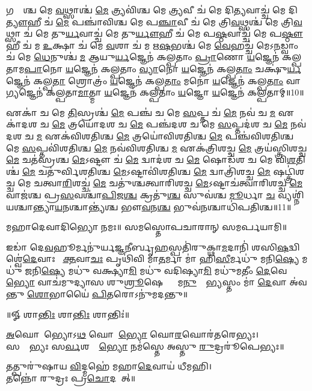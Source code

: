 𑌗𑌰𑍍𑌭𑌾᳚𑌶𑍍𑌚 𑌮𑍇 \ul{𑌵}𑌥𑍍𑌸𑌾𑌶𑍍𑌚॑ \ul{𑌮𑍇} 𑌤𑍍𑌰𑍍𑌯𑌵𑌿॑𑌶𑍍𑌚 𑌮𑍇 \ul{𑌤𑍍𑌰𑍍𑌯}𑌵𑍀 𑌚॑ 𑌮𑍇 𑌦𑌿\ul{𑌤𑍍𑌯}𑌵𑌾𑌚𑍍𑌚॑ 𑌮𑍇 𑌦𑌿\ul{𑌤𑍍𑌯𑍗}𑌹𑍀 𑌚॑ \ul{𑌮𑍇} 𑌪𑌞𑍍𑌚𑌾॑𑌵𑌿𑌶𑍍𑌚 𑌮𑍇 𑌪\ul{𑌞𑍍𑌚𑌾}𑌵𑍀 𑌚॑ 𑌮𑍇 𑌤𑍍𑌰𑌿\ul{𑌵}𑌥𑍍𑌸𑌶𑍍𑌚॑ 𑌮𑍇 𑌤𑍍𑌰𑌿\ul{𑌵}𑌥𑍍𑌸𑌾 𑌚॑ 𑌮𑍇 𑌤𑍁\ul{𑌰𑍍𑌯}𑌵𑌾𑌚𑍍𑌚॑ 𑌮𑍇 𑌤𑍁\ul{𑌰𑍍𑌯𑍗}𑌹𑍀 𑌚॑ 𑌮𑍇 𑌪\ul{𑌷𑍍𑌠}𑌵𑌾𑌚𑍍𑌚॑ 𑌮𑍇 𑌪\ul{𑌷𑍍𑌠𑍗}𑌹𑍀 𑌚॑ 𑌮 \ul{𑌉}𑌕𑍍𑌷𑌾 𑌚॑ 𑌮𑍇 \ul{𑌵}𑌶𑌾 𑌚॑ 𑌮 𑌋\ul{𑌷}𑌭𑌶𑍍𑌚॑ 𑌮𑍇 \ul{𑌵𑍇}𑌹𑌚𑍍𑌚॑ 𑌮𑍇𑌽\ul{𑌨}𑌡𑍍𑌵𑌾𑌂 𑌚॑ 𑌮𑍇 \ul{𑌧𑍇}𑌨𑍁𑌶𑍍𑌚॑ \ul{𑌮} 𑌆𑌯𑍁\ul{𑌰𑍍𑌯}𑌜𑍍𑌞𑍇𑌨॑ 𑌕𑌲𑍍𑌪𑌤𑌾𑌂 \ul{𑌪𑍍𑌰𑌾}𑌣𑍋 \ul{𑌯}𑌜𑍍𑌞𑍇𑌨॑ 𑌕𑌲𑍍𑌪𑌤𑌾𑌮\ul{𑌪𑌾}𑌨𑍋 \ul{𑌯}𑌜𑍍𑌞𑍇𑌨॑ 𑌕𑌲𑍍𑌪𑌤𑌾𑌂 \ul{𑌵𑍍𑌯𑌾}𑌨𑍋 \ul{𑌯}𑌜𑍍𑌞𑍇𑌨॑ 𑌕𑌲𑍍𑌪\ul{𑌤𑌾𑌂} 𑌚𑌕𑍍𑌷𑍁॑\ul{𑌰𑍍𑌯}𑌜𑍍𑌞𑍇𑌨॑ 𑌕𑌲𑍍𑌪\ul{𑌤𑌾}\ul{} 𑌶𑍍𑌰𑍋𑌤𑍍𑌰𑌂॑ \ul{𑌯}𑌜𑍍𑌞𑍇𑌨॑ 𑌕𑌲𑍍𑌪\ul{𑌤𑌾𑌂} 𑌮𑌨𑍋॑ \ul{𑌯}𑌜𑍍𑌞𑍇𑌨॑ 𑌕𑌲𑍍𑌪\ul{𑌤𑌾𑌂} 𑌵𑌾\ul{𑌗𑍍𑌯}𑌜𑍍𑌞𑍇𑌨॑ 𑌕𑌲𑍍𑌪𑌤𑌾\ul{𑌮𑌾}𑌤𑍍𑌮𑌾 \ul{𑌯}𑌜𑍍𑌞𑍇𑌨॑ 𑌕𑌲𑍍𑌪𑌤𑌾𑌂 \ul{𑌯}𑌜𑍍𑌞𑍋 \ul{𑌯}𑌜𑍍𑌞𑍇𑌨॑ 𑌕𑌲𑍍𑌪𑌤𑌾𑌮𑍍॥10॥ 

𑌏𑌕𑌾॑ 𑌚 𑌮𑍇 \ul{𑌤𑌿}𑌸𑍍𑌰𑌶𑍍𑌚॑ \ul{𑌮𑍇} 𑌪𑌞𑍍𑌚॑ 𑌚 𑌮𑍇 \ul{𑌸}𑌪𑍍𑌤 𑌚॑ \ul{𑌮𑍇} 𑌨𑌵॑ 𑌚 \ul{𑌮} 𑌏𑌕𑌾॑𑌦𑌶 𑌚 \ul{𑌮𑍇} 𑌤𑍍𑌰𑌯𑍋॑𑌦𑌶 𑌚 \ul{𑌮𑍇} 𑌪𑌞𑍍𑌚॑𑌦𑌶 𑌚 𑌮𑍇 \ul{𑌸}𑌪𑍍𑌤𑌦॑𑌶 𑌚 \ul{𑌮𑍇} 𑌨𑌵॑𑌦𑌶 𑌚 \ul{𑌮} 𑌏𑌕॑𑌵𑌿𑌶𑌤𑌿𑌶𑍍𑌚 \ul{𑌮𑍇} 𑌤𑍍𑌰𑌯𑍋॑𑌵𑌿𑌶𑌤𑌿𑌶𑍍𑌚 \ul{𑌮𑍇} 𑌪𑌞𑍍𑌚॑𑌵𑌿𑌶𑌤𑌿𑌶𑍍𑌚 𑌮𑍇 \ul{𑌸}𑌪𑍍𑌤𑌵𑌿॑𑌶𑌤𑌿𑌶𑍍𑌚 \ul{𑌮𑍇} 𑌨𑌵॑𑌵𑌿𑌶𑌤𑌿𑌶𑍍𑌚 \ul{𑌮} 𑌏𑌕॑𑌤𑍍𑌰𑌿𑌶𑌚𑍍𑌚 \ul{𑌮𑍇} 𑌤𑍍𑌰𑌯॑𑌸𑍍𑌤𑍍𑌰𑌿𑌶𑌚𑍍𑌚 \ul{𑌮𑍇} 𑌚𑌤॑𑌸𑍍𑌰𑌶𑍍𑌚 \ul{𑌮𑍇}𑌽𑌷𑍍𑌟𑍗 𑌚॑ \ul{𑌮𑍇} 𑌦𑍍𑌵𑌾𑌦॑𑌶 𑌚 \ul{𑌮𑍇} 𑌷𑍋𑌡॑𑌶 𑌚 𑌮𑍇 𑌵𑌿\ul{𑌶}𑌤𑌿𑌶𑍍𑌚॑ \ul{𑌮𑍇} 𑌚𑌤𑍁॑𑌰𑍍𑌵𑌿𑌶𑌤𑌿𑌶𑍍𑌚 \ul{𑌮𑍇}𑌽𑌷𑍍𑌟𑌾𑌵𑌿॑𑌶𑌤𑌿𑌶𑍍𑌚 \ul{𑌮𑍇} 𑌦𑍍𑌵𑌾𑌤𑍍𑌰𑌿॑𑌶𑌚𑍍𑌚 \ul{𑌮𑍇} 𑌷𑌟𑍍𑌤𑍍𑌰𑌿॑𑌶𑌚𑍍𑌚 𑌮𑍇 𑌚𑌤𑍍𑌵𑌾\ul{𑌰𑌿}\ul{}𑌶𑌚𑍍𑌚॑ \ul{𑌮𑍇} 𑌚𑌤𑍁॑𑌶𑍍𑌚𑌤𑍍𑌵𑌾𑌰𑌿𑌶𑌚𑍍𑌚 \ul{𑌮𑍇}𑌽𑌷𑍍𑌟𑌾𑌚॑𑌤𑍍𑌵𑌾𑌰𑌿𑌶𑌚𑍍𑌚 \ul{𑌮𑍇} 𑌵𑌾𑌜॑𑌶𑍍𑌚 𑌪𑍍𑌰\ul{𑌸}𑌵𑌶𑍍𑌚𑌾॑\ul{𑌪𑌿}𑌜\ul{𑌶𑍍𑌚} 𑌕𑍍𑌰𑌤𑍁॑\ul{𑌶𑍍𑌚} 𑌸𑍁𑌵॑𑌶𑍍𑌚 \ul{𑌮𑍂}𑌰𑍍𑌧𑌾 \ul{𑌚} 𑌵𑍍𑌯𑌶𑍍𑌨𑌿॑𑌯𑌶𑍍𑌚𑌾𑌨𑍍𑌤𑍍𑌯𑌾\ul{𑌯}𑌨𑌶𑍍𑌚𑌾𑌨𑍍𑌤𑍍𑌯॑𑌶𑍍𑌚 𑌭𑍗\ul{𑌵}𑌨\ul{𑌶𑍍𑌚} 𑌭𑍁𑌵॑\ul{𑌨}𑌶𑍍𑌚𑌾𑌧𑌿॑𑌪𑌤𑌿𑌶𑍍𑌚॥11॥ 

𑌮𑌹𑌾𑌦𑍇𑌵𑌾𑌦𑌿𑌭𑍍𑌯𑍋 𑌨𑌮𑌃॥ 𑌸𑌮𑌸𑍍𑌤𑍋𑌪𑌚𑌾𑌰𑌾𑌨𑍍 𑌸𑌮𑌰𑍍𑌪𑌯𑌾𑌮𑌿॥

𑌇𑌡𑌾॑ 𑌦𑍇\ul{𑌵}𑌹𑍂𑌰𑍍𑌮𑌨𑍁॑𑌰𑍍𑌯\ul{𑌜𑍍𑌞}𑌨𑍀𑌰𑍍𑌬𑍃\ul{𑌹}𑌸𑍍𑌪𑌤𑌿॑𑌰𑍁𑌕𑍍𑌥𑌾\ul{𑌮}𑌦𑌾𑌨𑌿॑ 𑌶𑌸𑌿\ul{𑌷}𑌦𑍍𑌵𑌿𑌶𑍍𑌵𑍇॑\ul{𑌦𑍇}𑌵𑌾𑌃 𑌸𑍂᳚\ul{𑌕𑍍𑌤}𑌵𑌾\ul{𑌚𑌃} 𑌪𑍃𑌥𑌿॑𑌵𑌿 𑌮𑌾\ul{𑌤}𑌰𑍍𑌮𑌾 𑌮𑌾॑ 𑌹𑌿\ul{𑌸𑍀}𑌰𑍍𑌮𑌧𑍁॑ 𑌮𑌨𑌿\ul{𑌷𑍍𑌯𑍇} 𑌮𑌧𑍁॑ 𑌜𑌨𑌿\ul{𑌷𑍍𑌯𑍇} 𑌮𑌧𑍁॑ 𑌵𑌕𑍍𑌷𑍍𑌯𑌾\ul{𑌮𑌿} 𑌮𑌧𑍁॑ 𑌵𑌦𑌿𑌷𑍍𑌯𑌾\ul{𑌮𑌿} 𑌮𑌧𑍁॑𑌮𑌤𑍀𑌂 \ul{𑌦𑍇}𑌵𑍇\ul{𑌭𑍍𑌯𑍋} 𑌵𑌾𑌚॑𑌮𑍁𑌦𑍍𑌯𑌾𑌸 𑌶𑍁\ul{𑌶𑍍𑌰𑍂}𑌷𑍇𑌣𑍍𑌯𑌾𑌂᳚ 𑌮\ul{𑌨𑍁}𑌷𑍍𑌯𑍇᳚\ul{𑌭𑍍𑌯}𑌸𑍍𑌤𑌂 𑌮𑌾॑ \ul{𑌦𑍇}𑌵𑌾 𑌅॑𑌵𑌨𑍍𑌤𑍁 \ul{𑌶𑍋}𑌭𑌾𑌯𑍈॑ \ul{𑌪𑌿}𑌤𑌰𑍋𑌽𑌨𑍁॑𑌮𑌦𑌨𑍍𑌤𑍁॥ 

\centerline{॥𑍐 𑌶𑌾\ul{𑌨𑍍𑌤𑌿𑌃} 𑌶𑌾\ul{𑌨𑍍𑌤𑌿𑌃} 𑌶𑌾𑌨𑍍𑌤𑌿𑌃॑॥}

{\small \closesection}

\ul{𑌅}𑌘𑍋𑌰𑍇᳚𑌭𑍍𑌯𑍋𑌽\ul{𑌥} 𑌘𑍋𑌰𑍇᳚\ul{𑌭𑍍𑌯𑍋} 𑌘𑍋\ul{𑌰}𑌘𑍋𑌰॑𑌤𑌰𑍇𑌭𑍍𑌯𑌃।\\
𑌸𑌰𑍍𑌵𑍇᳚𑌭𑍍𑌯𑌃 𑌸\ul{𑌰𑍍𑌵}𑌶𑌰𑍍𑌵𑍇᳚\ul{𑌭𑍍𑌯𑍋} 𑌨𑌮॑𑌸𑍍𑌤𑍇 𑌅𑌸𑍍𑌤𑍁 \ul{𑌰𑍁}𑌦𑍍𑌰𑌰𑍂॑𑌪𑍇𑌭𑍍𑌯𑌃॥

𑌤𑌤𑍍𑌪𑍁𑌰𑍁॑𑌷𑌾𑌯 \ul{𑌵𑌿}𑌦𑍍𑌮𑌹𑍇॑ 𑌮𑌹𑌾\ul{𑌦𑍇}𑌵𑌾𑌯॑ 𑌧𑍀𑌮𑌹𑌿।\\
𑌤𑌨𑍍𑌨𑍋॑ 𑌰𑍁𑌦𑍍𑌰𑌃 𑌪𑍍𑌰\ul{𑌚𑍋}𑌦𑌯𑌾᳚𑌤𑍍॥

